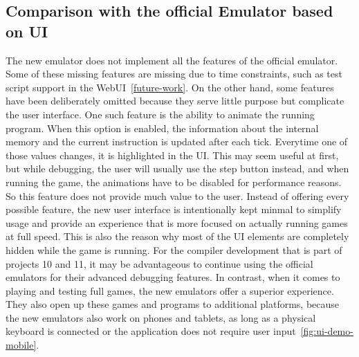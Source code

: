 
\subsection{Comparison with the official Emulator based on UI} \label{ui-compatibility}
The new emulator does not implement all the features of the official emulator.
Some of these missing features are missing due to time constraints, such as test script support in the WebUI~\ref{future-work}.
On the other hand, some features have been deliberately omitted because they serve little purpose but complicate the user interface.
One such feature is the ability to animate the running program.
When this option is enabled, the information about the internal memory and the current instruction is updated after each tick.
Everytime one of those values changes, it is highlighted in the UI.
This may seem useful at first, but while debugging, the user will usually use the step button instead, and when running the game, the animations have to be disabled for performance reasons.
So this feature does not provide much value to the user.
Instead of offering every possible feature, the new user interface is intentionally kept minmal to simplify usage and provide an experience that is more focused on actually running games at full speed.
This is also the reason why most of the UI elements are completely hidden while the game is running.
For the compiler development that is part of projects 10 and 11, it may be advantageous to continue using the official emulators for their advanced debugging features.
In contrast, when it comes to playing and testing full games, the new emulators offer a superior experience.
They also open up these games and programs to additional platforms, because the new emulators also work on phones and tablets, as long as a physical keyboard is connected or the application does not require user input~\ref{fig:ui-demo-mobile}.

